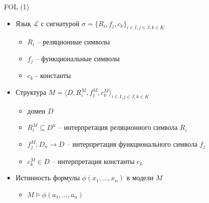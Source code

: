 \documentclass{beamer}
\begin{document}
\begin{frame}{FOL (1)}
\begin{itemize}
	\item Язык $\mathcal{L}$ с сигнатурой $\sigma = \{ R_i, f_j, c_k \}_{i \in I, j \in J, k \in K}$
		\medskip
		\begin{itemize}
			\item $R_i$ -- реляционные символы
			\item $f_j$ -- функциональные символы
			\item $c_k$ - константы
		\end{itemize}
	\bigskip
	\item Структура $M = \langle D, R_i^M, f_j^M, c_k^M \rangle_{i \in I, j \in J, k \in K}$
		\medskip
		\begin{itemize}
			\item домен $D$ 
			\item $R_i^M \subseteq D^n$ -- интерпретация реляционного символа $R_i$
			\item $f_j^M : D_n \to D$ -- интерпретация функционального символа $f_j$
			\item $c_k^M \in D$ -- интерпретация константы $c_k$
		\end{itemize}
	\bigskip
	\item Истинность формулы $\phi(x_1, \dots, x_n)$ в модели $M$
		\medskip
		\begin{itemize}
			\item $M \models \phi(a_1, \dots, a_n)$
		\end{itemize}
\end{itemize}
\end{frame}
\end{document}
